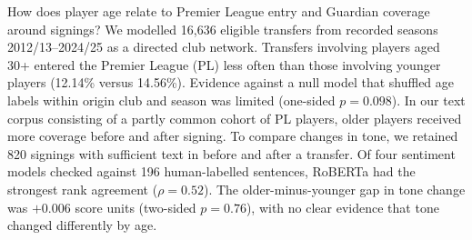 How does player age relate to Premier League entry and Guardian coverage around signings? We modelled 16,636 eligible transfers from recorded seasons 2012/13--2024/25 as a directed club network. Transfers involving players aged 30+ entered the Premier League (PL) less often than those involving younger players (12.14\% versus 14.56\%). Evidence against a null model that shuffled age labels within origin club and season was limited (one-sided $p=0.098$). In our text corpus consisting of a partly common cohort of PL players, older players received more coverage before and after signing. To compare changes in tone, we retained 820 signings with sufficient text in before and after a transfer. Of four sentiment models checked against 196 human-labelled sentences, RoBERTa had the strongest rank agreement ($\rho=0.52$). The older-minus-younger gap in tone change was $+0.006$ score units (two-sided $p=0.76$), with no clear evidence that tone changed differently by age.